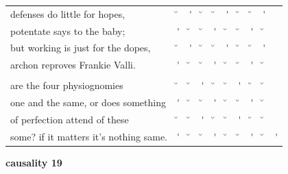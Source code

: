 \documentclass[12pt, landscape]{article}
\begin{document}
\begin{center}
\begin{tabularx}{\textwidth}{
>{\lefting\arraybackslash}X
c
c
c
c
c
c
c
c
c
}

defenses do little for hopes, & \u{} & \'{} & \u{} & \u{} & \'{} & \u{} & \u{} & \'{} & \\
potentate says to the baby; & \'{} & \u{} & \u{} & \'{} & \u{} & \u{} & \'{} & \u{} & \\
but working is just for the dopes, & \u{} & \'{} & \u{} & \u{} & \'{} & \u{} & \u{} & \'{} & \\
archon reproves Frankie Valli. & \'{} & \u{} & \u{} & \'{} & \u{} & \u{} & \'{} & \u{} & \\
 & & & & & & & & \\
are the four physiognomies & \u{} & \u{} & \'{} & \u{} & \u{} & \'{} & \u{} & \u{} & \\
one and the same, or does something & \'{} & \u{} & \u{} & \'{} & \u{} & \u{} & \'{} & \u{} & \\
of perfection attend of these & \u{} & \u{} & \'{} & \u{} & \u{} & \'{} & \u{} & \u{} & \\
some? if it matters it's nothing same. & \'{} & \u{} & \u{} & \'{} & \u{} & \u{} & \'{} & \u{} & \'{} \\

\end{tabularx}
\end{center}

\vspace*{\fill}

\newpage

\vspace*{\fill}

\noindent \textbf{causality 19}
\noindent \hfill \par
\end{document}
